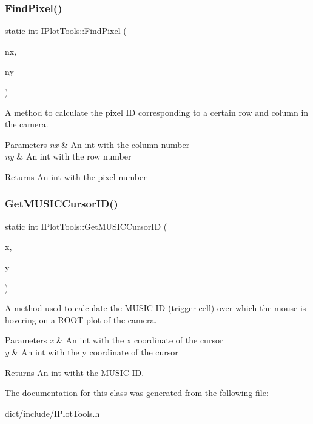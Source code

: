 \subsubsection{\texorpdfstring{Find\+Pixel()}{FindPixel()}}
{\footnotesize\ttfamily static int I\+Plot\+Tools\+::\+Find\+Pixel (\begin{DoxyParamCaption}\item[{int}]{nx,  }\item[{int}]{ny }\end{DoxyParamCaption})\hspace{0.3cm}{\ttfamily [static]}}



A method to calculate the pixel ID corresponding to a certain row and column in the camera. 


\begin{DoxyParams}{Parameters}
{\em nx} & An int with the column number \\
\hline
{\em ny} & An int with the row number\\
\hline
\end{DoxyParams}
\begin{DoxyReturn}{Returns}
An int with the pixel number 
\end{DoxyReturn}
\mbox{\label{classIPlotTools_a0e2f7e9cf1a12de048199efadf86088f}} 
\subsubsection{\texorpdfstring{Get\+M\+U\+S\+I\+C\+Cursor\+I\+D()}{GetMUSICCursorID()}}
{\footnotesize\ttfamily static int I\+Plot\+Tools\+::\+Get\+M\+U\+S\+I\+C\+Cursor\+ID (\begin{DoxyParamCaption}\item[{int}]{x,  }\item[{int}]{y }\end{DoxyParamCaption})\hspace{0.3cm}{\ttfamily [static]}}



A method used to calculate the M\+U\+S\+IC ID (trigger cell) over which the mouse is hovering on a R\+O\+OT plot of the camera. 


\begin{DoxyParams}{Parameters}
{\em x} & An int with the x coordinate of the cursor \\
\hline
{\em y} & An int with the y coordinate of the cursor\\
\hline
\end{DoxyParams}
\begin{DoxyReturn}{Returns}
An int witht the M\+U\+S\+IC ID. 
\end{DoxyReturn}


The documentation for this class was generated from the following file\+:\begin{DoxyCompactItemize}
\item 
dict/include/I\+Plot\+Tools.\+h\end{DoxyCompactItemize}
